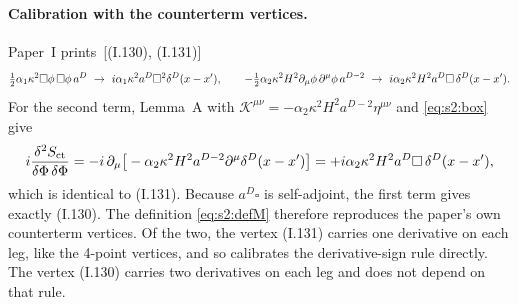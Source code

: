 \documentclass[aps,prd,onecolumn,10pt,nofootinbib,floatfix]{revtex4-2}
\newcommand{\PI}{Paper~I}
\newcommand{\eqI}[1]{(I.#1)}
\begin{document}
\paragraph*{Calibration with the counterterm vertices.}
\PI{} prints~[\eqI{130}, \eqI{131}]
\begin{equation*}
\tfrac12\alpha_1\kappa^2\square\phi\,\square\phi\,a^D\ \to\ i\alpha_1\kappa^2a^D\square^2\sIIdel,
\qquad
-\tfrac12\alpha_2\kappa^2H^2\partial_\mu\phi\,\partial^\mu\phi\,a^{D-2}\ \to\ i\alpha_2\kappa^2H^2a^D\square\,\sIIdel .
\end{equation*}
For the second term, Lemma~A with
$\mathcal K^{\mu\nu}=-\alpha_2\kappa^2H^2a^{D-2}\eta^{\mu\nu}$ and
\eqref{eq:s2:box} give
\begin{equation}
i\frac{\delta^2S_{\rm ct}}{\delta\Phi\,\delta\Phi}
=-i\,\partial_\mu\big[-\alpha_2\kappa^2H^2a^{D-2}\partial^\mu\delta^D(x-x')\big]
=+i\alpha_2\kappa^2H^2a^D\square\,\delta^D(x-x') ,
\label{eq:s2:calib131}
\end{equation}
which is identical to \eqI{131}. Because $a^D\square$ is self-adjoint, the
first term gives exactly \eqI{130}. The definition \eqref{eq:s2:defM}
therefore reproduces the paper's own counterterm vertices. Of the two,
the vertex \eqI{131} carries one derivative on each leg, like the 4-point
vertices, and so calibrates the derivative-sign rule directly. The vertex
\eqI{130} carries two derivatives on each leg and does not depend on that
rule.
\end{document}
